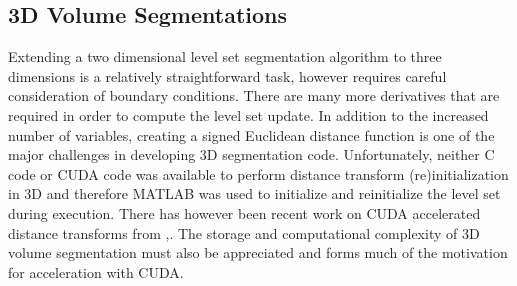 	\subsection{3D Volume Segmentations}\label{3dvolumesegmentation}
Extending a two dimensional level set segmentation algorithm to three dimensions is a relatively straightforward task, however requires careful consideration of boundary conditions. There are many more derivatives that are required in order to compute the level set update. In addition to the increased number of variables, creating a signed Euclidean distance function is one of the major challenges in developing 3D segmentation code. Unfortunately, neither C code or CUDA code was available to perform distance transform (re)initialization in 3D and therefore MATLAB was used to initialize and reinitialize the level set during execution. There has however been recent work on CUDA accelerated distance transforms from \cite{difi},\cite{gpgpudistance}.
The storage and computational complexity of 3D volume segmentation must also be appreciated and forms much of the motivation for acceleration with CUDA.